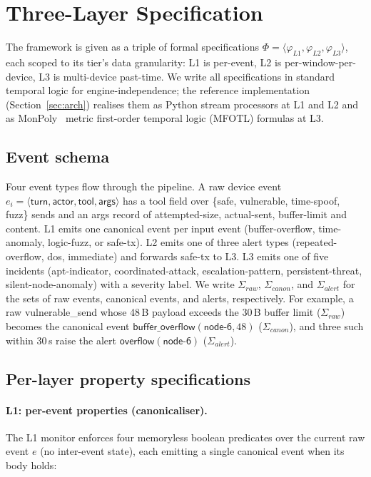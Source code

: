 \documentclass[runningheads]{llncs}
\begin{document}
\section{Three-Layer Specification}
\label{sec:spec}

The framework is given as a triple of formal specifications
$\Phi = \langle \varphi_{L1}, \varphi_{L2}, \varphi_{L3} \rangle$,
each scoped to its tier's data granularity: L1 is per-event,
L2 is per-window-per-device, L3 is multi-device past-time.  We
write all specifications in standard temporal logic for
engine-independence; the reference implementation
(Section~\ref{sec:arch}) realises them as Python stream
processors at L1 and L2 and as MonPoly~\cite{monpoly2014}
metric first-order temporal logic (MFOTL) formulas at L3.

\subsection{Event schema}
\label{sec:spec:schema}
Four event types flow through the pipeline.  A raw device event
$e_i = \langle\textsf{turn},\textsf{actor},\textsf{tool},
\textsf{args}\rangle$ has a \textsf{tool} field over \{safe,
vulnerable, time-spoof, fuzz\} sends and an \textsf{args} record
of attempted-size, actual-sent, buffer-limit and content.  L1 emits one
canonical event per input event (buffer-overflow, time-anomaly,
logic-fuzz, or safe-tx).  L2 emits one of three alert types
(repeated-overflow, dos, immediate) and forwards safe-tx to L3.
L3 emits one of five incidents (apt-indicator,
coordinated-attack, escalation-pattern, persistent-threat, silent-node-anomaly) with
a severity label.  We write $\Sigma_{\mathit{raw}}$,
$\Sigma_{\mathit{canon}}$, and $\Sigma_{\mathit{alert}}$ for the
sets of raw events, canonical events, and alerts, respectively.
For example, a raw \textsf{vulnerable\_send} whose 48\,B payload
exceeds the 30\,B buffer limit ($\Sigma_{\mathit{raw}}$) becomes the canonical event
$\textsf{buffer\_overflow}(\textsf{node-6},48)$
($\Sigma_{\mathit{canon}}$), and three such within 30\,s raise the
alert $\textsf{overflow}(\textsf{node-6})$
($\Sigma_{\mathit{alert}}$).

\subsection{Per-layer property specifications}
\label{sec:spec:layers}
\paragraph{L1: per-event properties (canonicaliser).}
The L1 monitor enforces four memoryless boolean predicates over
the current raw event $e$ (no inter-event state), each emitting
a single canonical event when its body holds:
\end{document}
